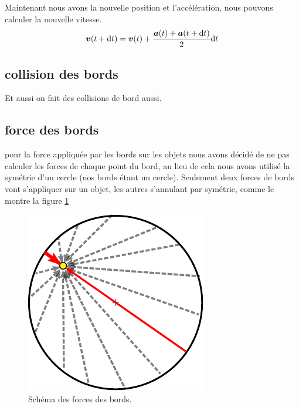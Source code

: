\documentclass[a4paper, 11pt, oneside]{article} %
\newcommand{\dd}[1]{\mathrm{d}#1}
\begin{document}
            Maintenant nous avons la nouvelle position et l'accélération, nous pouvons calculer la nouvelle vitesse.
            \begin{equation}
                \label{verletVitesse}
                \vb*{v}(t+\dd t) = \vb*{v}(t)+\frac{\vb*{a}(t)+\vb*{a}(t+\dd t)}{2}\dd t 
            \end{equation}
    \subsection{collision des bords}
        Et aussi on fait des collisions de bord aussi.
    \subsection{force des bords}
        pour la force appliquée par les bords sur les objets nous avons décidé de ne pas calculer les forces de chaque point du bord, au lieu de cela nous avons utilisé la symétrie d'un cercle (nos bords étant un cercle). Seulement deux forces de bords vont s'appliquer sur un objet, les autres s'annulant par symétrie, comme le montre la figure \ref{Force_Bord_schéma}
        \begin{figure}
            \centering
            \includegraphics{Figure_Force_Bord.pdf}
            \caption{Schéma des forces des bords.}
            \label{Force_Bord_schéma}
        \end{figure}
            
\end{document}
